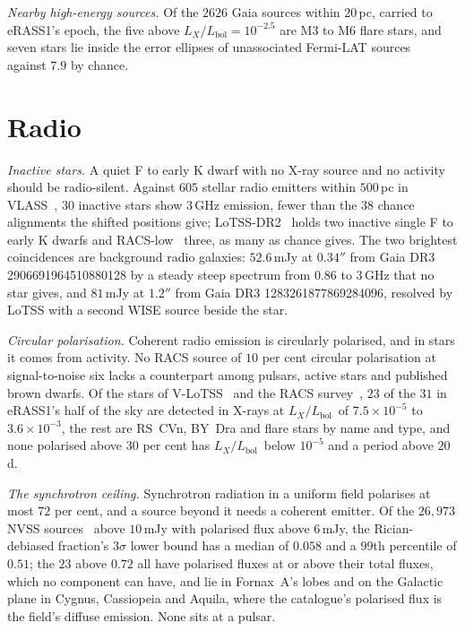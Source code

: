 \documentclass[3p,11pt]{elsarticle}
\newcommand{\lxl}{$L_X/L_\mathrm{bol}$}
\begin{document}
\emph{Nearby high-energy sources.} Of the $2626$ Gaia sources within $20$\,pc, carried to
eRASS1's epoch, the five above \lxl$=10^{-2.5}$ are M3 to M6 flare stars, and seven stars
lie inside the error ellipses of unassociated Fermi-LAT sources~\cite{Abdollahi2022}
against $7.9$ by chance.

\section{Radio}\label{sec:radio}

\emph{Inactive stars.} A quiet F to early K dwarf with no X-ray source and no activity
should be radio-silent. Against $605$ stellar radio emitters within $500$\,pc in
VLASS~\cite{Lacy2020}, $30$ inactive stars show $3$\,GHz emission, fewer than the $38$
chance alignments the shifted positions give; LoTSS-DR2~\cite{Shimwell2022} holds two
inactive single F to early K dwarfs and RACS-low~\cite{Hale2021} three, as many as chance
gives. The two brightest coincidences are background radio galaxies: $52.6$\,mJy at
$0.34''$ from Gaia DR3 2906691964510880128 by a steady steep spectrum from $0.86$ to
$3$\,GHz that no star gives, and $81$\,mJy at $1.2''$ from Gaia DR3 1283261877869284096,
resolved by LoTSS with a second WISE source beside the star.

\emph{Circular polarisation.} Coherent radio emission is circularly polarised, and in
stars it comes from activity. No RACS source of $10$ per cent circular polarisation at
signal-to-noise six lacks a counterpart among pulsars, active stars and published brown
dwarfs. Of the stars of V-LoTSS~\cite{Callingham2023} and the RACS
survey~\cite{Pritchard2021}, $23$ of the $31$ in eRASS1's half of the sky are detected in
X-rays at \lxl\ of $7.5\times10^{-5}$ to $3.6\times10^{-3}$, the rest are RS~CVn, BY~Dra
and flare stars by name and type, and none polarised above $30$ per cent has
\lxl\ below $10^{-5}$ and a period above $20$\,d.

\emph{The synchrotron ceiling.} Synchrotron radiation in a uniform field polarises at
most $72$ per cent, and a source beyond it needs a coherent emitter. Of the $26{,}973$
NVSS sources~\cite{Condon1998} above $10$\,mJy with polarised flux above $6$\,mJy, the
Rician-debiased fraction's $3\sigma$ lower bound has a median of $0.058$ and a $99$th
percentile of $0.51$; the $23$ above $0.72$ all have polarised fluxes at or above their
total fluxes, which no component can have, and lie in Fornax~A's lobes and on the Galactic
plane in Cygnus, Cassiopeia and Aquila, where the catalogue's polarised flux is the
field's diffuse emission. None sits at a pulsar.
\end{document}
